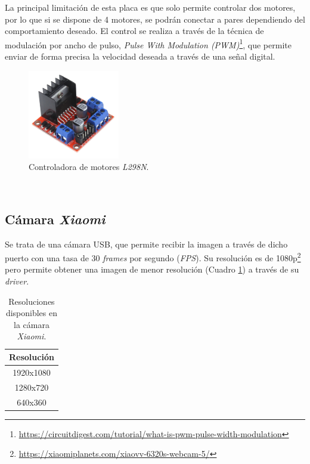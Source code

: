 La principal limitación de esta placa es que solo permite controlar dos motores, por lo que si se dispone de 4 motores, se podrán conectar a pares dependiendo del comportamiento deseado. El control se realiza a través de la técnica de modulación por ancho de pulso, \textit{Pulse With Modulation (PWM)}\footnote{\url{https://circuitdigest.com/tutorial/what-is-pwm-pulse-width-modulation}}, que permite enviar de forma precisa la velocidad deseada a través de una señal digital.\\

\begin{figure} [h!]
	\begin{center}
		\includegraphics[width=4cm]{figs/l298n}
	\end{center}
	\caption{Controladora de motores \textit{L298N}.}
	\label{fig:l298n}
\end{figure}\

\subsection{Cámara \textit{Xiaomi}}
\label{subsection:xiaomicamera}
Se trata de una cámara USB, que permite recibir la imagen a través de dicho puerto con una tasa de 30 \textit{frames} por segundo (\textit{FPS}). Su resolución es de 1080p\footnote{\url{https://xiaomiplanets.com/xiaovv-6320s-webcam-5/}} pero permite obtener una imagen de menor resolución (Cuadro \ref{table:camera}) a través de su \textit{driver}.\\

\begin{table}[H]
	\begin{center}
		\begin{tabular}{|c|}
			\hline
			\textbf{Resolución}
			\\
			\hline
			1920x1080
			\\
			1280x720
			\\
			640x360
			\\
			\hline
		\end{tabular}
		\caption{Resoluciones disponibles en la cámara \textit{Xiaomi}.}
		\label{table:camera}
	\end{center}
\end{table}

